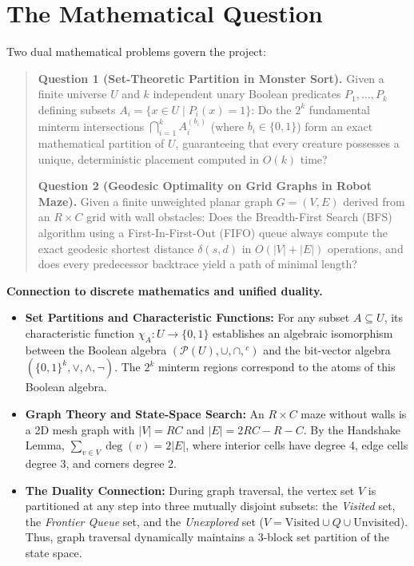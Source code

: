 \documentclass[11pt,a4paper]{article}
\begin{document}
\section{The Mathematical Question}

Two dual mathematical problems govern the project:

\begin{quote}
\textbf{Question 1 (Set-Theoretic Partition in Monster Sort).} Given a finite universe $U$ and $k$ independent unary Boolean predicates $P_1, \dots, P_k$ defining subsets $A_i = \{x \in U \mid P_i(x) = 1\}$:
Do the $2^k$ fundamental minterm intersections $\bigcap_{i=1}^k A_i^{(b_i)}$ (where $b_i \in \{0, 1\}$) form an exact mathematical partition of $U$, guaranteeing that every creature possesses a unique, deterministic placement computed in $O(k)$ time?

\textbf{Question 2 (Geodesic Optimality on Grid Graphs in Robot Maze).} Given a finite unweighted planar graph $G = (V, E)$ derived from an $R \times C$ grid with wall obstacles:
Does the Breadth-First Search (BFS) algorithm using a First-In-First-Out (FIFO) queue always compute the exact geodesic shortest distance $\delta(s, d)$ in $O(|V| + |E|)$ operations, and does every predecessor backtrace yield a path of minimal length?
\end{quote}

\textbf{Connection to discrete mathematics and unified duality.}
\begin{itemize}
  \item \textbf{Set Partitions and Characteristic Functions:} For any subset $A \subseteq U$, its characteristic function $\chi_A : U \to \{0, 1\}$ establishes an algebraic isomorphism between the Boolean algebra $(\mathcal{P}(U), \cup, \cap, {}^c)$ and the bit-vector algebra $(\{0, 1\}^k, \lor, \land, \neg)$. The $2^k$ minterm regions correspond to the atoms of this Boolean algebra.
  \item \textbf{Graph Theory and State-Space Search:} An $R \times C$ maze without walls is a 2D mesh graph with $|V| = RC$ and $|E| = 2RC - R - C$. By the Handshake Lemma, $\sum_{v \in V} \operatorname{deg}(v) = 2|E|$, where interior cells have degree 4, edge cells degree 3, and corners degree 2.
  \item \textbf{The Duality Connection:} During graph traversal, the vertex set $V$ is partitioned at any step into three mutually disjoint subsets: the \textit{Visited} set, the \textit{Frontier Queue} set, and the \textit{Unexplored} set ($V = \text{Visited} \cup Q \cup \text{Unvisited}$). Thus, graph traversal dynamically maintains a 3-block set partition of the state space.
\end{itemize}
\end{document}
